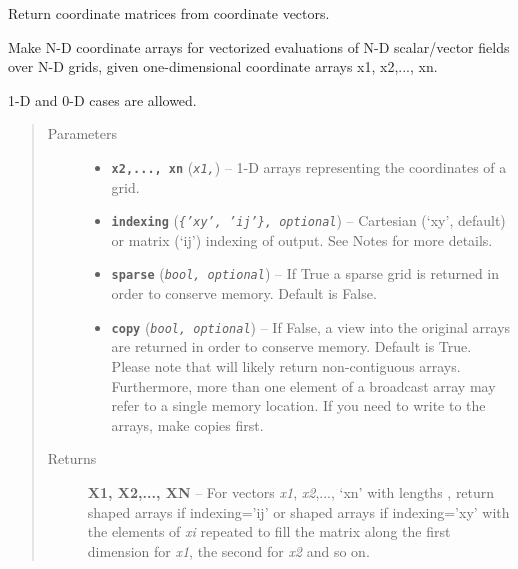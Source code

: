 \documentclass[letterpaper,10pt,english]{sphinxmanual}
\begin{document}
\begin{fulllineitems}
\label{usage:numpy.meshgrid}
Return coordinate matrices from coordinate vectors.

Make N-D coordinate arrays for vectorized evaluations of
N-D scalar/vector fields over N-D grids, given
one-dimensional coordinate arrays x1, x2,..., xn.

1-D and 0-D cases are allowed.
\begin{quote}\begin{description}
\item[{Parameters}] \leavevmode\begin{itemize}
\item {} 
\textbf{\texttt{x2,..., xn}} (\emph{\texttt{x1,}}) -- 1-D arrays representing the coordinates of a grid.

\item {} 
\textbf{\texttt{indexing}} (\emph{\texttt{\{'xy', 'ij'\}, optional}}) -- 
Cartesian (`xy', default) or matrix (`ij') indexing of output.
See Notes for more details.



\item {} 
\textbf{\texttt{sparse}} (\emph{\texttt{bool, optional}}) -- 
If True a sparse grid is returned in order to conserve memory.
Default is False.



\item {} 
\textbf{\texttt{copy}} (\emph{\texttt{bool, optional}}) -- 
If False, a view into the original arrays are returned in order to
conserve memory.  Default is True.  Please note that
 will likely return non-contiguous
arrays.  Furthermore, more than one element of a broadcast array
may refer to a single memory location.  If you need to write to the
arrays, make copies first.



\end{itemize}

\item[{Returns}] \leavevmode
\textbf{X1, X2,..., XN} --
For vectors \emph{x1}, \emph{x2},..., `xn' with lengths  ,
return  shaped arrays if indexing='ij'
or  shaped arrays if indexing='xy'
with the elements of \emph{xi} repeated to fill the matrix along
the first dimension for \emph{x1}, the second for \emph{x2} and so on.


\end{description}
\end{quote}
\end{fulllineitems}
\end{document}
